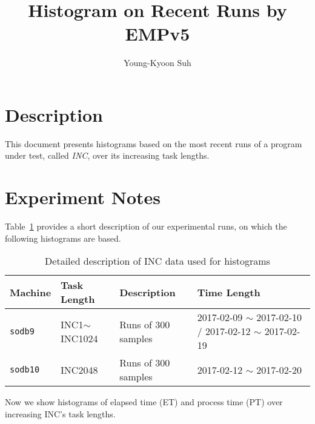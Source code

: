 \documentclass[10pt]{article}
\begin{document}
\title{Histogram on Recent Runs by EMPv5}

\author{
Young-Kyoon Suh\\
}
\maketitle

\section{Description}
This document presents histograms based on the most recent runs 
of a program under test, called {\em INC}, over its increasing task lengths. 

\section{Experiment Notes}
Table~\ref{tab:exp_notes} provides a short description of our experimental runs, 
on which the following histograms are based.

\begin{table}[h]
\begin{center}
\begin{tabular}{|p{2cm}|p{3cm}|p{6cm}|p{4cm}|} \hline
Machine & Task Length & Description & Time Length\\ \hline
{\tt sodb9} &  INC1$\sim$INC1024 & Runs of 300 samples & 2017-02-09 $\sim$ 2017-02-10 / 2017-02-12 $\sim$ 2017-02-19\\ \hline
{\tt sodb10} & INC2048 & Runs of 300 samples & 2017-02-12 $\sim$ 2017-02-20\\ \hline
\end{tabular}
\end{center}
\vspace{-.2in}
\caption{Detailed description of INC data used for histograms\label{tab:exp_notes}}
\end{table}

Now we show histograms of elapsed time (ET) and process time (PT) 
over increasing INC's task lengths. 

\newpage


\end{document}
